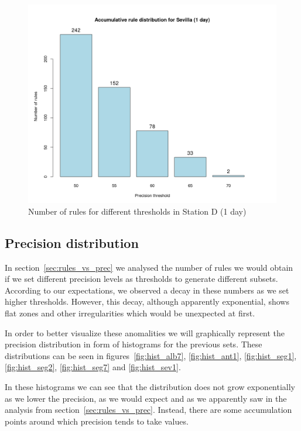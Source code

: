 \begin{figure}[hbtp]
\includegraphics[width=\textwidth]{img/precision_sev1.png}
\caption{Number of rules for different thresholds in Station D (1 day)} \label{fig:precision_sev1}
\end{figure}

\clearpage

\subsection{Precision distribution}
\label{sec:precision_distribution}
In section~\ref{sec:rules_vs_prec} we analysed the number of rules we would obtain if we set different precision levels as thresholds to generate different subsets. According to our expectations, we observed a decay in these numbers as we set higher thresholds. However, this decay, although apparently exponential, shows flat zones and other irregularities which would be unexpected at first.

In order to better visualize these anomalities we will graphically represent the precision distribution in form of histograms for the previous sets. These distributions can be seen in figures~\ref{fig:hist_alb7}, \ref{fig:hist_ant1}, \ref{fig:hist_seg1}, \ref{fig:hist_seg2}, \ref{fig:hist_seg7} and \ref{fig:hist_sev1}.

In these histograms we can see that the distribution does not grow exponentially as we lower the precision, as we would expect and as we apparently saw in the analysis from section~\ref{sec:rules_vs_prec}. Instead, there are some accumulation points around which precision tends to take values. 

